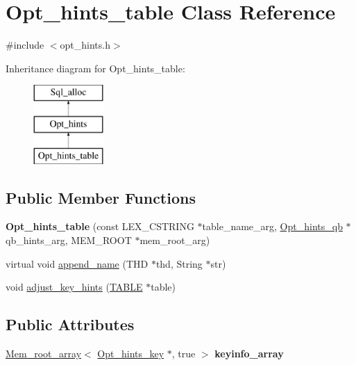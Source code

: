 \hypertarget{classOpt__hints__table}{}\section{Opt\+\_\+hints\+\_\+table Class Reference}
\label{classOpt__hints__table}


{\ttfamily \#include $<$opt\+\_\+hints.\+h$>$}

Inheritance diagram for Opt\+\_\+hints\+\_\+table\+:\begin{figure}[H]
\begin{center}
\leavevmode
\includegraphics[height=3.000000cm]{classOpt__hints__table}
\end{center}
\end{figure}
\subsection*{Public Member Functions}
\begin{DoxyCompactItemize}
\item 
\mbox{\label{classOpt__hints__table_aa7fd6c8c4d437415b787e5610c8bab21}} 
{\bfseries Opt\+\_\+hints\+\_\+table} (const L\+E\+X\+\_\+\+C\+S\+T\+R\+I\+NG $\ast$table\+\_\+name\+\_\+arg, \mbox{\hyperlink{classOpt__hints__qb}{Opt\+\_\+hints\+\_\+qb}} $\ast$qb\+\_\+hints\+\_\+arg, M\+E\+M\+\_\+\+R\+O\+OT $\ast$mem\+\_\+root\+\_\+arg)
\item 
virtual void \mbox{\hyperlink{classOpt__hints__table_a6346c17e9a02e2724480b271c5b6c867}{append\+\_\+name}} (T\+HD $\ast$thd, String $\ast$str)
\item 
void \mbox{\hyperlink{classOpt__hints__table_aeac4bb4a24d03d700942dec8410dc525}{adjust\+\_\+key\+\_\+hints}} (\mbox{\hyperlink{structTABLE}{T\+A\+B\+LE}} $\ast$table)
\end{DoxyCompactItemize}
\subsection*{Public Attributes}
\begin{DoxyCompactItemize}
\item 
\mbox{\label{classOpt__hints__table_a072d0a28f5e02ffc4e8127d97d54c5a3}} 
\mbox{\hyperlink{classMem__root__array}{Mem\+\_\+root\+\_\+array}}$<$ \mbox{\hyperlink{classOpt__hints__key}{Opt\+\_\+hints\+\_\+key}} $\ast$, true $>$ {\bfseries keyinfo\+\_\+array}
\end{DoxyCompactItemize}
